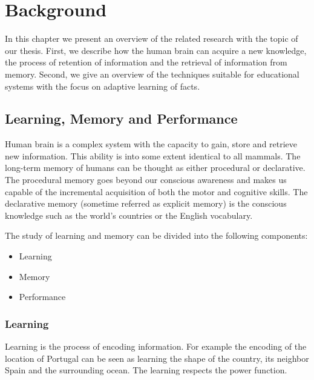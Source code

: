 \chapter{Background}

In this chapter we present an overview of the related research with the topic of our thesis. First, we describe how the human brain can acquire a new knowledge, the process of retention of information and the retrieval of information from memory. Second, we give an overview of the techniques suitable for educational systems with the focus on adaptive learning of facts.

\section{Learning, Memory and Performance}


Human brain is a complex system with the capacity to gain, store and retrieve new information. This ability is into some extent identical to all mammals. The long-term memory of humans can be thought as either procedural or declarative. The procedural memory goes beyond our conscious awareness and makes us capable of the incremental acquisition of both the motor and cognitive skills. The declarative memory (sometime referred as explicit memory) is the conscious knowledge such as the world's countries or the English vocabulary.

The study of learning and memory can be divided into the following components:

\begin{itemize}
  \item Learning
  \item Memory
  \item Performance
\end{itemize}

\subsection{Learning}


Learning is the process of encoding information. For example the encoding of the location of Portugal can be seen as learning the shape of the country,  its neighbor Spain and the surrounding ocean. The learning respects the power function.

